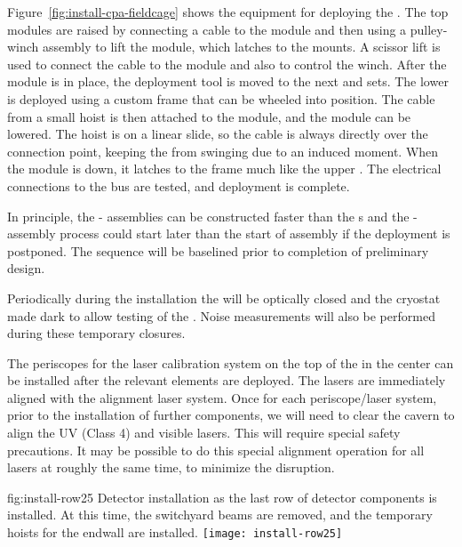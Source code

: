 Figure~\ref{fig:install-cpa-fieldcage} shows the equipment for deploying the . 
The top  modules are raised by connecting a cable to the module and then using a pulley-winch assembly to lift the module, which latches to the  mounts. 
A scissor lift is used to connect the cable to the module and also to control the winch. 
After the module is in place, the deployment tool is moved to the next  and  sets. 
The lower  is deployed using a custom frame that can be wheeled into position. 
The cable from a small hoist is then attached to the  module, and the module can be lowered. 
The hoist is on a linear slide, so the cable is always directly over the connection point, 
keeping the  from swinging due to an induced moment. 
When the module is down, it latches to the  frame much like the upper . 
The electrical connections to the  bus are tested, and deployment is complete. 

In principle, the - assemblies can be constructed faster than the s and %
the - assembly process could start later than the start of  assembly if the deployment is postponed. The sequence will be baselined prior to completion of preliminary design.

Periodically during the  installation the  will be %
optically closed and the cryostat made dark to allow testing of the . Noise measurements will also be performed during these temporary closures.

The periscopes for the laser calibration system on the top of the  in the center can be installed after the relevant  elements  are deployed. The lasers are immediately aligned with the alignment laser system. 
Once for each periscope/laser system, prior to the installation of further  components, we will need to clear the cavern to align the UV (Class 4) and visible lasers.  This will require special safety precautions. 
It may be possible to do this special alignment operation for all lasers at roughly the same time, to minimize the disruption.

\begin{dunefigure}{fig:install-row25}
  {Detector installation as the last row of detector components is installed. At this time, the switchyard beams are removed, and the temporary hoists for the endwall  are installed.}
\texttt{[image: install-row25]}
\end{dunefigure}


